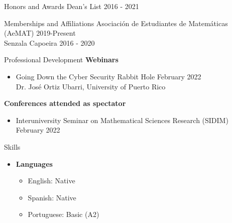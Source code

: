 \documentclass{resume} %
\begin{document}
\begin{rSection}{Honors and Awards}
    Dean's List \hfill{2016 - 2021}
\end{rSection}

\begin{rSection}{Memberships and Affiliations}
    Asociaci\'on de Estudiantes de Matem\'aticas (AeMAT) \hfill{2019-Present} \\
    Senzala Capoeira \hfill{2016 - 2020} \\
\end{rSection}


\begin{rSection}{Professional Development}
    \textbf{Webinars}
    \begin{itemize}
        \item Going Down the Cyber Security Rabbit Hole \hfill{February 2022} \\
        \hspace*{10mm} Dr. Jos\'e Ortiz Ubarri, University of Puerto Rico
    \end{itemize}
    \textbf{Conferences attended as spectator}
    \begin{itemize}
        \item Interuniversity Seminar on Mathematical Sciences Research (SIDIM)
        \hfill{February 2022}
    \end{itemize}

\end{rSection}

\begin{rSection}{Skills}
    \begin{itemize}
        \item \textbf{Languages}
            \begin{itemize}
                \item English: Native

                \item Spanish: Native

                \item Portuguese: Basic (A2)
            \end{itemize}
    \end{itemize}
\end{rSection}

\pagebreak
\end{document}
